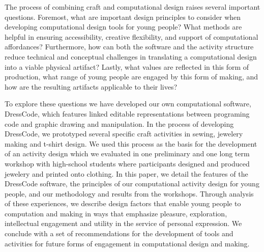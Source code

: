 \documentclass{sigchi}
\begin{document}
The process of combining craft and computational design raises several important questions. Foremost, what are important design principles to consider when developing computational design tools for young people? What methods are helpful in ensuring accessibility, creative flexibility, and support of computational affordances? Furthermore, how can both the software and the activity structure reduce technical and conceptual challenges in translating a computational design into a viable physical artifact? Lastly, what values are reflected in this form of production, what range of young people are engaged by this form of making, and how are the resulting artifacts applicable to their lives?

To explore these questions we have developed our own computational software, DressCode, which features linked editable representations between programing code and graphic drawing and manipulation. In the process of developing DressCode, we prototyped several specific craft activities in sewing, jewelery making and t-shirt design. We used this process as the basis for the development of an activity design which we evaluated in one preliminary and one long term workshop with high-school students where participants designed and produced jewelery and printed onto clothing. In this paper, we detail the features of the DressCode software, the principles of our computational activity design for young people, and our methodology and results from the workshops. Through analysis of these experiences, we describe design factors that enable young people to computation and making in ways that emphasize pleasure, exploration, intellectual engagement and utility in the service of personal expression. We conclude with a set of recommendations for the development of tools and activities for future forms of engagement in computational design and making.
\end{document}
